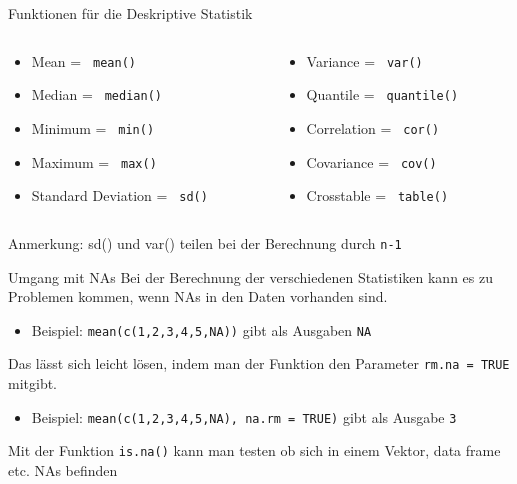 \documentclass[xcolor=dvipsnames, aspectratio = 169]{beamer}
\begin{document}
\begin{frame}[fragile]{Funktionen für die Deskriptive Statistik}
\begin{columns}[T]
	\begin{column}{0.5\textwidth}
		\begin{itemize}
			\item Mean = \verb+ mean() +
			\item Median = \verb+ median() +
			\item Minimum = \verb+ min() +
			\item Maximum = \verb+ max() +
			\item Standard Deviation = \verb+ sd() +
		\end{itemize}
	\end{column}
	\begin{column}{0.5\textwidth}
		\begin{itemize}
			\item Variance = \verb+ var() +
			\item Quantile = \verb+ quantile() +
			\item Correlation = \verb+ cor() +
			\item Covariance = \verb+ cov() +
			\item Crosstable = \verb+ table() +
		\end{itemize}
	\end{column}
\end{columns}
Anmerkung: sd() und var() teilen bei der Berechnung durch \verb+n-1+
\end{frame}

\begin{frame}[fragile]{Umgang mit NAs}
	Bei der Berechnung der verschiedenen Statistiken kann es zu Problemen kommen, wenn NAs in den Daten vorhanden sind.\\
	\begin{itemize}
			\item Beispiel: \verb+mean(c(1,2,3,4,5,NA))+ gibt als Ausgaben \verb+NA+\\
	\end{itemize}
	Das lässt sich leicht lösen, indem man der Funktion den Parameter \verb+rm.na = TRUE+ mitgibt.\\
	\begin{itemize}
			\item Beispiel: \verb+mean(c(1,2,3,4,5,NA), na.rm = TRUE)+ gibt als Ausgabe \verb+3+
	\end{itemize}
	Mit der Funktion \verb+is.na()+ kann man testen ob sich in einem Vektor, data frame etc. NAs befinden
\end{frame}
\end{document}
